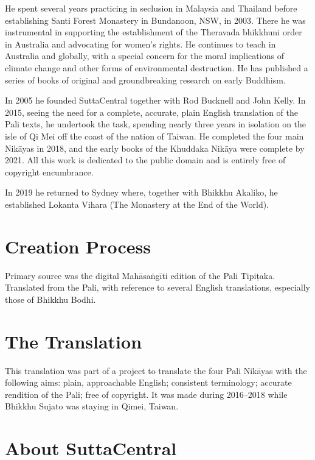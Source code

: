 \documentclass[12pt,openany]{book}%
\begin{document}
He spent several years practicing in seclusion in Malaysia and Thailand before establishing Santi Forest Monastery in Bundanoon, NSW, in 2003. There he was instrumental in supporting the establishment of the Theravada bhikkhuni order in Australia and advocating for women’s rights. He continues to teach in Australia and globally, with a special concern for the moral implications of climate change and other forms of environmental destruction. He has published a series of books of original and groundbreaking research on early Buddhism. 

In 2005 he founded SuttaCentral together with Rod Bucknell and John Kelly. In 2015, seeing the need for a complete, accurate, plain English translation of the Pali texts, he undertook the task, spending nearly three years in isolation on the isle of Qi Mei off the coast of the nation of Taiwan. He completed the four main \textsanskrit{Nikāyas} in 2018, and the early books of the Khuddaka \textsanskrit{Nikāya} were complete by 2021. All this work is dedicated to the public domain and is entirely free of copyright encumbrance. 

In 2019 he returned to Sydney where, together with Bhikkhu Akaliko, he established Lokanta Vihara (The Monastery at the End of the World). 

\section*{Creation Process}

Primary source was the digital \textsanskrit{Mahāsaṅgīti} edition of the Pali \textsanskrit{Tipiṭaka}. Translated from the Pali, with reference to several English translations, especially those of Bhikkhu Bodhi.

\section*{The Translation}

This translation was part of a project to translate the four Pali \textsanskrit{Nikāyas} with the following aims: plain, approachable English; consistent terminology; accurate rendition of the Pali; free of copyright. It was made during 2016–2018 while Bhikkhu Sujato was staying in Qimei, Taiwan.

\section*{About SuttaCentral}
\end{document}
